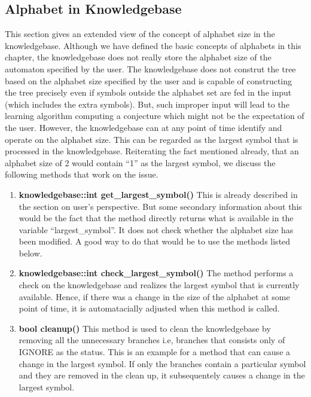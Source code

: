 \subsection*{Alphabet in Knowledgebase}
This section gives an extended view of the concept of alphabet size in the knowledgebase. Although we have defined the basic concepts of alphabets in this chapter, the knowledgebase does not really store the alphabet size of the automaton specified by the user. The knowledgebase does not construt the tree based on the alphabet size specified by the user and is capable of constructing the tree precisely even if symbols outside the alphabet set are fed in the input (which includes the extra symbols). But, such improper input will lead to the learning algorithm computing a conjecture which might not be the expectation of the user.
However, the knowledgebase can at any point of time identify and operate on the alphabet size. This can be regarded as the largest symbol that is processed in the knowledgebase. Reiterating the fact mentioned already, that an alphabet size of 2 would contain ``1'' as the largest symbol, we discuss the following methods that work on the issue.
\begin{enumerate}
\item \textbf{knowledgebase::int get\_largest\_symbol()} \vskip 1pt
This is already described in the section on user's perspective. But some secondary information about this would be the fact that the method directly returns what is available in the variable ``largest\_symbol''. It does not check whether the alphabet size has been modified. A good way to do that would be to use the methods listed below.
	
\item \textbf{knowledgebase::int check\_largest\_symbol()} \hfill \vskip 1pt
The method performs a check on the knowledgebase and realizes the largest symbol that is currently available. Hence, if there was a change in the size of the alphabet at some point of time, it is automatacially adjusted when this method is called.
	
\item \textbf{bool cleanup()} \hfill \vskip 1pt
This method is used to clean the knowledgebase by removing all the unnecessary branches i.e, branches that consists only of IGNORE as the status. This is an example for a method that can cause a change in the largest symbol. If only the branches contain a particular symbol and they are removed in the clean up, it subsequentely causes a change in the largest symbol. 
\end{enumerate}

